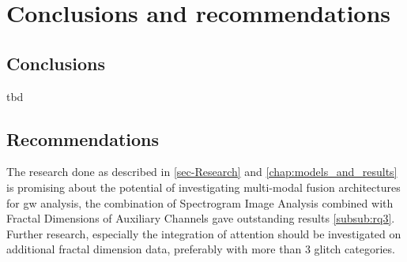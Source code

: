 \chapter{Conclusions and recommendations}
\label{ch:6}
\section{Conclusions}
tbd
\section{Recommendations}
The research done as described in \ref{sec-Research} and \ref{chap:models_and_results} is promising about the potential of investigating multi-modal fusion architectures for \acrshort{gw} analysis, the combination of Spectrogram Image Analysis combined with Fractal Dimensions of Auxiliary Channels gave outstanding results \ref{subsub:rq3}. \\
Further research, especially the integration of attention \citep{vaswani2017attention, niu2021review} should be investigated on additional fractal dimension data, preferably with more than 3 glitch categories. 